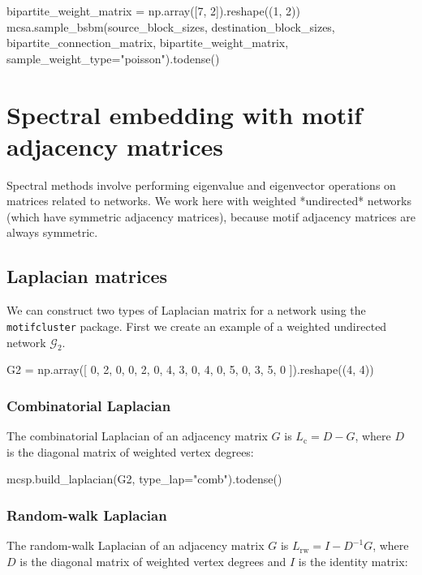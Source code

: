 \documentclass{article}
\begin{document}
\begin{pyconsole}
bipartite_weight_matrix = np.array([7, 2]).reshape((1, 2))
mcsa.sample_bsbm(source_block_sizes, destination_block_sizes,
  bipartite_connection_matrix, bipartite_weight_matrix,
  sample_weight_type="poisson").todense()
\end{pyconsole}




\section{Spectral embedding with motif adjacency matrices}

Spectral methods involve performing eigenvalue and
eigenvector operations on matrices related to networks.
We work here with weighted *undirected* networks
(which have symmetric adjacency matrices),
because motif adjacency matrices are always symmetric.

\subsection{Laplacian matrices}

We can construct two types of Laplacian matrix for a network
using the \texttt{motifcluster} package.
First we create an example of a weighted undirected network $\mathcal{G}_2$.

\begin{pyconsole}
G2 = np.array([
  0, 2, 0, 0,
  2, 0, 4, 3,
  0, 4, 0, 5,
  0, 3, 5, 0
]).reshape((4, 4))
\end{pyconsole}

\subsubsection{Combinatorial Laplacian}

The combinatorial Laplacian of an adjacency matrix $G$ is
$L_\mathrm{c} = D - G$,
where $D$ is the diagonal matrix of weighted vertex degrees:

\begin{pyconsole}
mcsp.build_laplacian(G2, type_lap="comb").todense()
\end{pyconsole}

\subsubsection{Random-walk Laplacian}

The random-walk Laplacian of an adjacency matrix $G$ is
$L_\mathrm{rw} = I - D^{-1}G$,
where $D$ is the diagonal matrix of weighted vertex degrees
and $I$ is the identity matrix:
\end{document}
